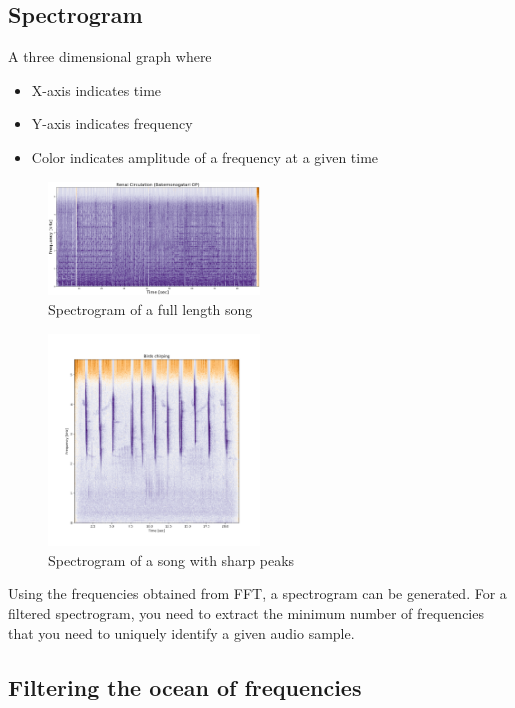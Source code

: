 \documentclass[12pt, a4paper]{IEEEtran}
\begin{document}
\subsection{Spectrogram}
A three dimensional graph where
\begin{itemize}
    \item X-axis indicates time
    \item Y-axis indicates frequency
    \item Color indicates amplitude of a frequency at a given time 
\end{itemize}
\begin{figure}[h]
\begin{center}
    \includegraphics[width=0.5\textwidth, height=0.2\textwidth, keepaspectratio]{ActualSong.png}
\end{center}
\captionsetup{justification=centering}
\caption{Spectrogram of a full length song}
\end{figure}
\begin{figure}[h]
    \begin{center}
        \includegraphics[width=0.5\textwidth, height=0.4\textwidth, keepaspectratio]{BirdsChirping.png}
    \end{center}
    \captionsetup{justification=centering}
    \caption{Spectrogram of a song with sharp peaks}
    \end{figure}
Using the frequencies obtained from FFT, a spectrogram can be generated. For a filtered spectrogram, you need to extract the minimum number of frequencies that you need to uniquely identify a given audio sample.

\subsection{Filtering the ocean of frequencies}
\end{document}

